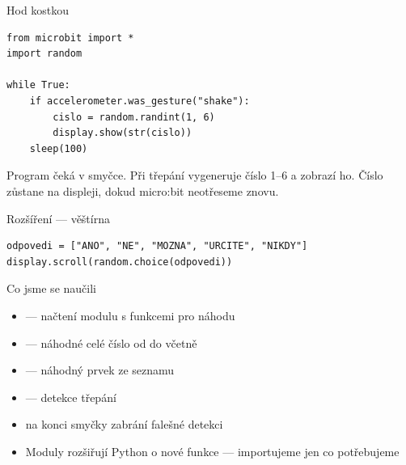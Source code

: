 \begin{frame}[fragile]{Hod kostkou}

  \begin{lstlisting}
from microbit import *
import random

while True:
    if accelerometer.was_gesture("shake"):
        cislo = random.randint(1, 6)
        display.show(str(cislo))
    sleep(100)
  \end{lstlisting}

  \bigskip
  Program čeká v smyčce. Při třepání vygeneruje číslo 1–6 a zobrazí ho.
  Číslo zůstane na displeji, dokud micro:bit neotřeseme znovu.

  \pause\bigskip
  \begin{exampleblock}{Rozšíření — věštírna}
    \begin{lstlisting}
odpovedi = ["ANO", "NE", "MOZNA", "URCITE", "NIKDY"]
display.scroll(random.choice(odpovedi))
    \end{lstlisting}
  \end{exampleblock}
\end{frame}

\begin{frame}{Co jsme se naučili}
  \begin{itemize}
    \item[\checkmark]  — načtení modulu s funkcemi pro náhodu
    \item[\checkmark]  — náhodné celé číslo od  do  včetně
    \item[\checkmark]  — náhodný prvek ze seznamu
    \item[\checkmark]  — detekce třepání
    \item[\checkmark]  na konci smyčky zabrání falešné detekci
    \item[\checkmark] Moduly rozšiřují Python o nové funkce — importujeme jen co potřebujeme
  \end{itemize}
\end{frame}



